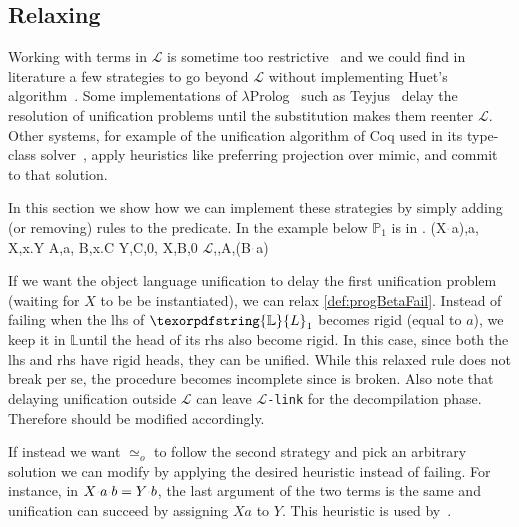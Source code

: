 \documentclass[sigconf,natbib=false,review]{acmart}
\newcommand{\appsep}{\ensuremath{\textcolor{lightgray}{\cdot}}}
\newcommand{\UnifRel}{\ensuremath{\simeq}}
\newcommand{\Uo}{\texorpdfstring{\ensuremath{\UnifRel_o}\xspace}{unif\_o}}
\newcommand{\llambda}{\ensuremath{\mathcal{L}}\xspace}
\newcommand{\linkMacro}[1]{\ensuremath{#1}\texttt{-link}\xspace}
\newcommand{\linkbeta}{\linkMacro{\llambda}}
\newcommand{\lhs}{lhs\xspace}
\newcommand{\rhs}{rhs\xspace}
\newcommand{\linkStore}{\texorpdfstring{\ensuremath{\mathbb{L}}\xspace}{L}}
\newcommand{\foUnifPb}{\ensuremath{\mathbb{P}}\xspace}
\begin{document}
\subsection{\texorpdfstring{Relaxing }{Relaxing progress-llam-fail}}
\label{sec:heuristics}
\newcommand{\progBetaNoLLWait}{\emph{progress-beta-\notllambda}}

Working with terms in \llambda is sometime too restrictive~\cite{Abel2018ExtensionsTM}
and we could find in literature a few strategies to go beyond \llambda without 
implementing Huet's algorithm~\cite{Huet75}.
Some implementations of $\lambda$Prolog~\cite{lamProlog} such as
Teyjus~\cite{Nadathur2001} delay the resolution of \notllambda unification
problems until the substitution makes them reenter \llambda. Other systems, for
example of the unification algorithm of Coq used in its type-class
solver~\cite{sozeau08}, apply heuristics like preferring projection over mimic,
and commit to that solution.

In this section we show how we can implement these strategies
by simply adding (or removing) rules to the
 predicate.
In the example below $\foUnifPb_1$ is in \notllambda.
%
\printAlll
  {{{(X\appsep a),a},
    {X,\lambda x.Y}}}
  {{{A,a},
    {B,\lambda x.C}}}
  {{{Y,C,0},
    {X,B,0}}}
  {{{\llambda,,A,(B\appsep a)}}}

\noindent
If we want the object language unification to delay the first unification problem
(waiting for $X$ to be be instantiated),
we can relax \cref{def:progBetaFail}. 
Instead of failing when the \lhs of $\linkStore_1$ becomes rigid (equal to $a$),
we keep it in \linkStore until the head of its \rhs also become rigid.
In this case, since both the \lhs and \rhs have rigid heads, they can be unified.
While this relaxed rule does not break  per se,
the  procedure becomes incomplete since
 is broken. Also note that delaying unification outside \llambda can leave \linkbeta for the
decompilation phase. Therefore  should
be modified accordingly.

If instead we want \Uo{} to follow the second strategy and pick an
arbitrary solution we can modify \progress by applying the desired heuristic
instead of failing.
For instance, in $X \appsep a \appsep b = Y \appsep b$, the last
argument of the two terms is the same and unification can succeed by assigning
$X a$ to $Y$. This heuristic is used by~\cite{sozeau08}.
\end{document}
